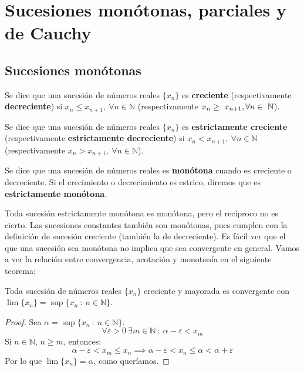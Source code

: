 \chapter{Sucesiones monótonas, parciales y de Cauchy}\label{chp:Tema6}


\section{Sucesiones monótonas}
\begin{definicion}
    Se dice que una sucesión de números reales $\{x_n\}$ es \textbf{creciente} (respectivamente \textbf{decreciente}) si $x_n \leq x_{n+1}, ~\forall n \in \mathbb{N}$ (respectivamente $x_n \geq~x_{n+1},\\\forall n \in~\mathbb{N}$).
\end{definicion}

\begin{definicion}
    Se dice que una sucesión de números reales $\{x_n\}$ es \textbf{estrictamente creciente} (respectivamente \textbf{estrictamente decreciente}) si $x_n < x_{n+1}, ~\forall n \in \mathbb{N}$ (respectivamente $x_n > x_{n+1}, ~\forall n \in \mathbb{N}$).
\end{definicion}

\begin{definicion}
    Se dice que una sucesión de números reales es \textbf{monótona} cuando es creciente o decreciente. Si el crecimiento o decrecimiento es estrico, diremos que es \textbf{estrictamente monótona}.
\end{definicion}

Toda sucesión estrictamente monótona es monótona, pero el recíproco no es cierto. Las sucesiones constantes también son monótonas, pues cumplen con la definición de sucesión creciente (también la de decreciente). Es fácil ver que el que una sucesión sea monótona no implica que sea convergente en general. Vamos a ver la relación entre convergencia, acotación y monotonía
en el siguiente teorema:
\begin{teo}
    Toda sucesión de números reales $\{x_n\}$ creciente y mayorada es convergente con $\lim \{x_n\}=\sup \{x_n ~:~ n \in \mathbb{N}\}$.
\end{teo}
\begin{proof}
    Sea $\alpha = \sup \{x_n ~:~ n \in \mathbb{N}\}$.
    \begin{equation*}
        \forall \varepsilon > 0 ~\exists m \in \mathbb{N} ~:~ \alpha - \varepsilon < x_m
    \end{equation*}
    Si $n \in \mathbb{N}$, $n \geq m$, entonces:
    \begin{equation*}
        \alpha - \varepsilon < x_m \leq x_n \implies \alpha - \varepsilon < x_n \leq \alpha < \alpha + \varepsilon
    \end{equation*}
    Por lo que $\lim \{x_n\} = \alpha$, como queríamos. 
\end{proof}

